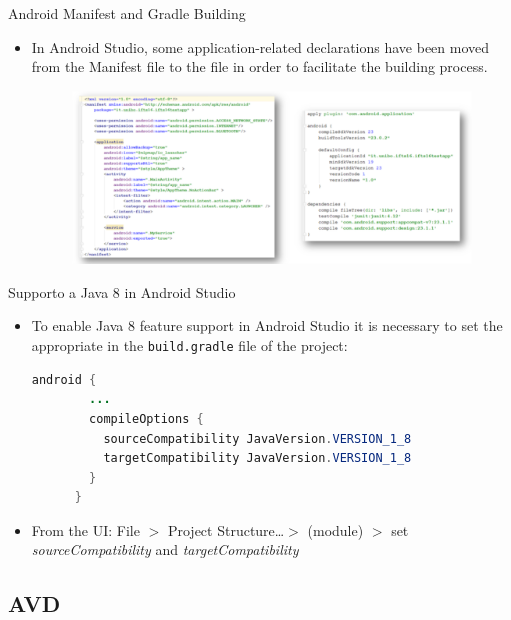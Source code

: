 \documentclass{beamer}
\begin{document}
  \begin{frame}{Android Manifest and Gradle Building}
    \begin{itemize}
      \item In Android Studio, some application-related declarations have been
      moved from the Manifest file to the  file in order to
      facilitate the building process.
      \begin{figure}
        \includegraphics[width=1\linewidth]{figures/manifest-1.png}
      \end{figure}
    \end{itemize}
  \end{frame}

  \begin{frame}[fragile]{Supporto a Java 8 in Android Studio}
    \begin{itemize}
      \item To enable Java 8 feature support in Android Studio it is necessary to
      set the appropriate  in the \texttt{build.gradle} file
      of the project:
      \begin{lstlisting}[language=Java]
      android {
        ...
        compileOptions {
          sourceCompatibility JavaVersion.VERSION_1_8
          targetCompatibility JavaVersion.VERSION_1_8
        }
      }
      \end{lstlisting}
      \item From the UI: File $>$ Project Structure\dots $>$ (module) $>$ set
      \emph{sourceCompatibility} and \emph{targetCompatibility}
    \end{itemize}
  \end{frame}


\subsection{AVD}
\end{document}

